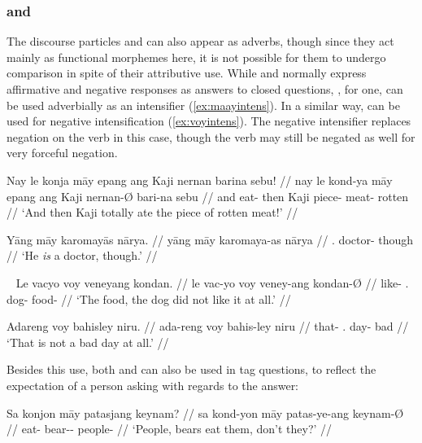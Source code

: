 \subsubsection{ and }

The discourse particles  and  can 
also appear as adverbs, though since they act mainly as functional morphemes 
here, it is not possible for them to undergo comparison in spite of their 
attributive use. While  and  normally 
express affirmative and negative responses as answers to closed questions, 
, for one, can be used adverbially as an intensifier 
(\ref{ex:maayintens}). In a similar way,  can be used for 
negative intensification (\ref{ex:voyintens}). The negative intensifier 
replaces negation on the verb in this case, though the verb may still be 
negated as well for very forceful negation.

\pex\label{ex:maayintens}
\a\begingl
	\gla Nay le konja māy epang ang Kaji nernan barina sebu! //
	\glb nay le kond-ya māy epang ang Kaji nernan-Ø bari-na sebu //
	\glc and \PatTI{} eat-\TsgM{} \Int{} then \Aarg{} Kaji piece-\Top{} 
		meat-\Gen{} rotten //
	\glft `And then Kaji totally ate the piece of rotten meat!' //
\endgl

\a\begingl
	\gla Yāng māy karomayās nārya. //
	\glb yāng māy karomaya-as nārya //
	\glc \TsgM{}.\Aarg{} \Int{} doctor-\Parg{} though // 
	\glft `He \emph{is} a doctor, though.' //
\endgl
\xe

\pex~\label{ex:voyintens}
\a\begingl
	\gla Le vacyo voy veneyang kondan. //
	\glb le vac-yo voy veney-ang kondan-Ø //
	\glc \PatTI{} like-\TsgN{} \Int{}.\Neg{} dog-\Aarg{} food-\Top{} //
	\glft `The food, the dog did not like it at all.' //
\endgl

\a\begingl
	\gla Adareng voy bahisley niru. //
	\glb ada-reng voy bahis-ley niru //
	\glc that-\AargI{} \Int{}.\Neg{} day-\PargI{} bad // 
	\glft `That is not a bad day at all.' //
\endgl
\xe

Besides this use, both  and  can also be used in
tag questions, to reflect the expectation of a person asking with regards to
the answer:

\pex
\a\label{ex:posexpect}\begingl
	\gla Sa konjon māy patasjang keynam? //
	\glb sa kond-yon māy patas-ye-ang keynam-Ø //
	\glc \PatT{} eat-\TplN{} \Aff{} bear-\Pl{}-\Aarg{} people-\Top{} //
	\glft `People, bears eat them, don't they?' //
\endgl

